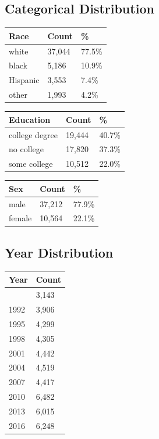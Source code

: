 \documentclass[
  12pt]{article}
\begin{document}
\subsection{Categorical Distribution}\label{categorical-distribution}

\begin{longtable}[]{@{}lll@{}}
\toprule\noalign{}
Race & Count & \% \\
\midrule\noalign{}
\endhead
\bottomrule\noalign{}
\endlastfoot
white & 37,044 & 77.5\% \\
black & 5,186 & 10.9\% \\
Hispanic & 3,553 & 7.4\% \\
other & 1,993 & 4.2\% \\
\end{longtable}

\begin{longtable}[]{@{}lll@{}}
\toprule\noalign{}
Education & Count & \% \\
\midrule\noalign{}
\endhead
\bottomrule\noalign{}
\endlastfoot
college degree & 19,444 & 40.7\% \\
no college & 17,820 & 37.3\% \\
some college & 10,512 & 22.0\% \\
\end{longtable}

\begin{longtable}[]{@{}lll@{}}
\toprule\noalign{}
Sex & Count & \% \\
\midrule\noalign{}
\endhead
\bottomrule\noalign{}
\endlastfoot
male & 37,212 & 77.9\% \\
female & 10,564 & 22.1\% \\
\end{longtable}

\subsection{Year Distribution}\label{year-distribution}

\begin{longtable}[]{@{}ll@{}}
\toprule\noalign{}
Year & Count \\
\midrule\noalign{}
\endhead
\bottomrule\noalign{}
\endlastfoot
1989 & 3,143 \\
1992 & 3,906 \\
1995 & 4,299 \\
1998 & 4,305 \\
2001 & 4,442 \\
2004 & 4,519 \\
2007 & 4,417 \\
2010 & 6,482 \\
2013 & 6,015 \\
2016 & 6,248 \\
\end{longtable}
\end{document}
